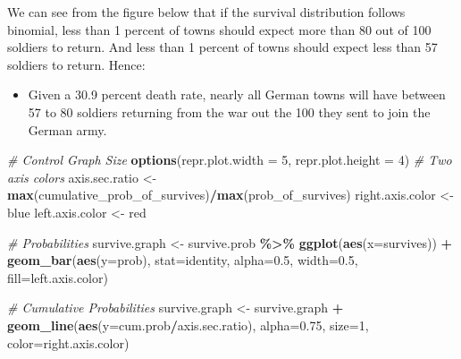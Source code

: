 \documentclass[
]{book}
\newenvironment{Shaded}{\begin{snugshade}}{\end{snugshade}}
\newcommand{\CommentTok}[1]{\textcolor[rgb]{0.56,0.35,0.01}{\textit{#1}}}
\newcommand{\DataTypeTok}[1]{\textcolor[rgb]{0.13,0.29,0.53}{#1}}
\newcommand{\DecValTok}[1]{\textcolor[rgb]{0.00,0.00,0.81}{#1}}
\newcommand{\FloatTok}[1]{\textcolor[rgb]{0.00,0.00,0.81}{#1}}
\newcommand{\KeywordTok}[1]{\textcolor[rgb]{0.13,0.29,0.53}{\textbf{#1}}}
\newcommand{\NormalTok}[1]{#1}
\newcommand{\OperatorTok}[1]{\textcolor[rgb]{0.81,0.36,0.00}{\textbf{#1}}}
\newcommand{\StringTok}[1]{\textcolor[rgb]{0.31,0.60,0.02}{#1}}
\providecommand{\tightlist}{%
  \setlength{\itemsep}{0pt}\setlength{\parskip}{0pt}}
\begin{document}
We can see from the figure below that if the survival distribution follows binomial, less than 1 percent of towns should expect more than 80 out of 100 soldiers to return. And less than 1 percent of towns should expect less than 57 soldiers to return. Hence:

\begin{itemize}
\tightlist
\item
  Given a 30.9 percent death rate, nearly all German towns will have between 57 to 80 soldiers returning from the war out the 100 they sent to join the German army.
\end{itemize}

\begin{Shaded}
\begin{Highlighting}[]
\CommentTok{\# Control Graph Size}
\KeywordTok{options}\NormalTok{(}\DataTypeTok{repr.plot.width =} \DecValTok{5}\NormalTok{, }\DataTypeTok{repr.plot.height =} \DecValTok{4}\NormalTok{)}
\CommentTok{\# Two axis colors}
\NormalTok{axis.sec.ratio \textless{}{-}}\StringTok{ }\KeywordTok{max}\NormalTok{(cumulative\_prob\_of\_survives)}\OperatorTok{/}\KeywordTok{max}\NormalTok{(prob\_of\_survives)}
\NormalTok{right.axis.color \textless{}{-}}\StringTok{ \textquotesingle{}blue\textquotesingle{}}
\NormalTok{left.axis.color \textless{}{-}}\StringTok{ \textquotesingle{}red\textquotesingle{}}

\CommentTok{\# Probabilities}
\NormalTok{survive.graph \textless{}{-}}\StringTok{ }\NormalTok{survive.prob }\OperatorTok{\%\textgreater{}\%}
\StringTok{    }\KeywordTok{ggplot}\NormalTok{(}\KeywordTok{aes}\NormalTok{(}\DataTypeTok{x=}\NormalTok{survives)) }\OperatorTok{+}
\StringTok{    }\KeywordTok{geom\_bar}\NormalTok{(}\KeywordTok{aes}\NormalTok{(}\DataTypeTok{y=}\NormalTok{prob),}
             \DataTypeTok{stat=}\StringTok{\textquotesingle{}identity\textquotesingle{}}\NormalTok{, }\DataTypeTok{alpha=}\FloatTok{0.5}\NormalTok{, }\DataTypeTok{width=}\FloatTok{0.5}\NormalTok{, }\DataTypeTok{fill=}\NormalTok{left.axis.color)}

\CommentTok{\# Cumulative Probabilities}
\NormalTok{survive.graph \textless{}{-}}\StringTok{ }\NormalTok{survive.graph }\OperatorTok{+}
\StringTok{    }\KeywordTok{geom\_line}\NormalTok{(}\KeywordTok{aes}\NormalTok{(}\DataTypeTok{y=}\NormalTok{cum.prob}\OperatorTok{/}\NormalTok{axis.sec.ratio),}
              \DataTypeTok{alpha=}\FloatTok{0.75}\NormalTok{, }\DataTypeTok{size=}\DecValTok{1}\NormalTok{, }\DataTypeTok{color=}\NormalTok{right.axis.color)}


\end{Highlighting}
\end{Shaded}
\end{document}
